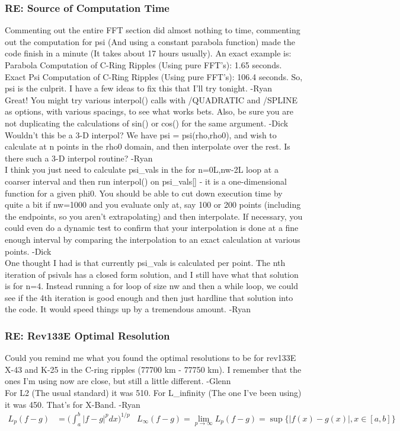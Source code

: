\documentclass[crop=false,class=book]{standalone}
\begin{document}
\subsubsection{\footnotesize RE: Source of Computation Time}
Commenting out the entire FFT section did almost nothing to time, commenting out the computation for psi (And using a constant parabola function) made the code finish in a minute (It takes about 17 hours usually). An exact example is: Parabola Computation of C-Ring Ripples (Using pure FFT's): 1.65 seconds. Exact Psi Computation of C-Ring Ripples (Using pure FFT's): 106.4 seconds. So, psi is the culprit. I have a few ideas to fix this that I'll try tonight. -Ryan\\
Great! You might try various interpol() calls with /QUADRATIC and /SPLINE as options, with various spacings, to see what works bets. Also, be sure you are not duplicating the calculations of sin() or cos() for the same argument. -Dick\\
Wouldn't this be a 3-D interpol? We have psi = psi(rho,rho0), and wish to calculate at n points in the rho0 domain, and then interpolate over the rest. Is there such a 3-D interpol routine? -Ryan\\
I think you just need to calculate psi\_vals in the for n=0L,nw-2L loop at a coarser interval and then run interpol() on psi\_vals[] - it is a one-dimensional function for a given phi0. You should be able to cut down execution time by quite a bit if nw=1000 and you evaluate only at, say 100 or 200 points (including the endpoints, so you aren't extrapolating) and then interpolate. If necessary, you could even do a dynamic test to confirm that your interpolation is done at a fine enough interval by comparing the interpolation to an exact calculation at various points. -Dick\\
One thought I had is that currently psi\_vals is calculated per point. The nth iteration of psivals has a closed form solution, and I still have what that solution is for n=4. Instead running a for loop of size nw and then a while loop, we could see if the 4th iteration is good enough and then just hardline that solution into the code. It would speed things up by a tremendous amount. -Ryan\\
\subsubsection{\footnotesize RE: Rev133E Optimal Resolution}
Could you remind me what you found the optimal resolutions to be for rev133E X-43 and K-25 in the C-ring ripples (77700 km - 77750 km). I remember that the ones I’m using now are close, but still a little different. -Glenn\\
For L2 (The usual standard) it was 510. For L\_infinity (The one I've been using) it was 450. That's for X-Band. -Ryan
\begin{align*}
    L_{p}(f-g)&=\bigg(\int_{a}^{b}|f-g|^{p}dx\bigg)^{1/p}&L_{\infty}(f-g)=\underset{p\rightarrow \infty}{\lim}L_{p}(f-g)=\sup\{|f(x)-g(x)|,x\in[a,b]\}
\end{align*}
\end{document}
